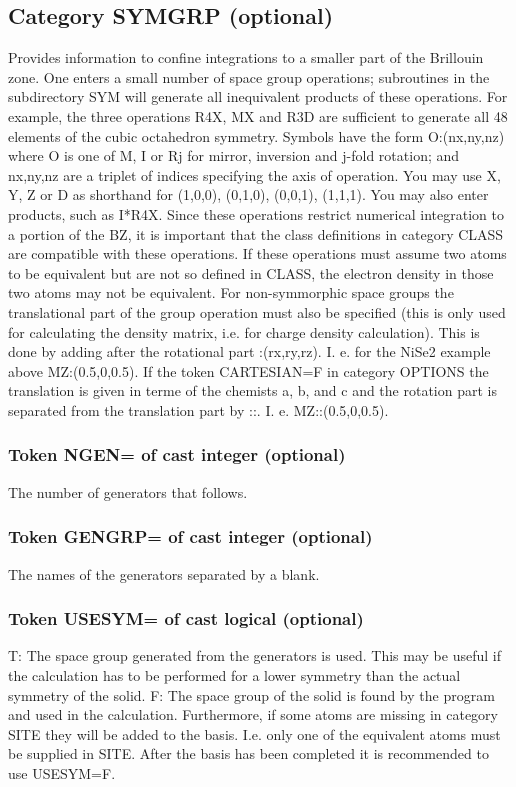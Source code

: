 \documentclass[aps,twocolumn,a4]{revtex4}
\begin{document}
\subsection{Category SYMGRP (optional)}
Provides information to confine integrations to a
smaller part of the Brillouin zone.  One enters a small number of space
group operations; subroutines in the subdirectory SYM
will generate all
inequivalent products of these operations.  For example, the three
operations R4X, MX and R3D are sufficient to generate all 48 elements of
the cubic octahedron symmetry.  Symbols have the form O:(nx,ny,nz) where
O is one of M, I or Rj for mirror, inversion and j-fold rotation; and
nx,ny,nz are a triplet of indices specifying the axis of operation.  You
may use X, Y, Z or D as shorthand for (1,0,0), (0,1,0), (0,0,1),
(1,1,1).  You may also enter products, such as I*R4X.  Since these
operations restrict numerical integration to a portion of the BZ, it is
important that the class definitions in category CLASS are compatible
with these operations.  If these operations must assume two atoms to be
equivalent but are not so defined in CLASS, the electron density in
those two atoms may not be equivalent.  For non-symmorphic space groups
the translational part of the group operation must also be specified
(this is only used for calculating the density matrix, i.e. for charge
density calculation).  This is done by adding after the rotational part
:(rx,ry,rz).  I. e. for the NiSe2 example above MZ:(0.5,0,0.5). If the
token CARTESIAN=F in category OPTIONS the translation is given in terme
of the chemists a, b, and c and the rotation part is separated from the
translation part by ::. I. e. MZ::(0.5,0,0.5).

\subsubsection{Token NGEN= of cast integer (optional)}
The number of generators that follows.

\subsubsection{Token GENGRP= of cast integer (optional)}
The names of the generators separated by a blank.

\subsubsection{Token USESYM= of cast logical (optional)}
T: The space group generated from the generators is used.
This may be useful if the calculation has to be performed for a lower
symmetry than the actual symmetry of the solid. F: The space group of
the solid is found by the program
and used in the calculation.
Furthermore, if some atoms are missing in
category SITE they will be added to the basis.  I.e. only one of the
equivalent atoms must be supplied in SITE.
After the basis has been completed it is recommended to use USESYM=F.
\end{document}

